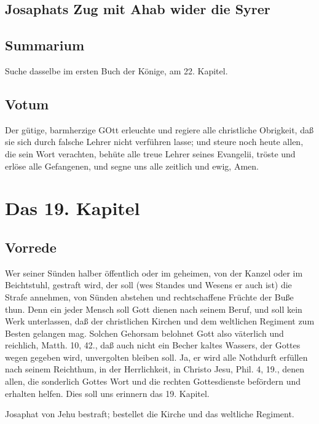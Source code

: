 \section[Josaphats Zug mit Ahab wider die Syrer]{Josaphats Zug mit Ahab wider die Syrer}

\section{Summarium}

Suche dasselbe im ersten Buch der Könige, am 22. Kapitel.

\section{Votum}

Der gütige, barmherzige GOtt erleuchte und regiere alle christliche Obrigkeit, daß sie sich durch falsche Lehrer nicht verführen lasse; und steure noch heute allen, die sein Wort verachten, behüte alle treue Lehrer seines Evangelii, tröste und erlöse alle Gefangenen, und segne uns alle zeitlich und ewig, Amen.

\chapter{Das 19. Kapitel}

\section{Vorrede}

Wer seiner Sünden halber öffentlich oder im geheimen, von der Kanzel oder im Beichtstuhl, gestraft wird, der soll (wes Standes und Wesens er auch ist) die Strafe annehmen, von Sünden abstehen und rechtschaffene Früchte der Buße thun. Denn ein jeder Mensch soll Gott dienen nach seinem Beruf, und soll kein Werk unterlassen, daß der christlichen Kirchen und dem weltlichen Regiment zum Besten gelangen mag. Solchen Gehorsam belohnet Gott also väterlich und reichlich, Matth. 10, 42., daß auch nicht ein Becher kaltes Wassers, der Gottes wegen gegeben wird, unvergolten bleiben soll. Ja, er wird alle Nothdurft erfüllen nach seinem Reichthum, in der Herrlichkeit, in Christo Jesu, Phil. 4, 19., denen allen, die sonderlich Gottes Wort und die rechten Gottesdienste befördern und erhalten helfen. Dies soll uns erinnern das 19. Kapitel.

Josaphat von Jehu bestraft; bestellet die Kirche und das weltliche Regiment.

